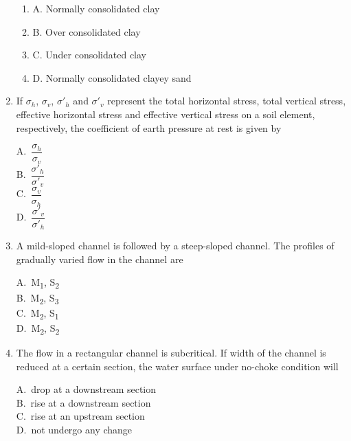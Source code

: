 \documentclass[journal,12pt,onecolumn]{IEEEtran}
\theoremstyle{remark}
\begin{document}
\begin{enumerate}
\begin{enumerate}[label=]
\item A. Normally consolidated clay \\
\item B. Over consolidated clay \\
\item C. Under consolidated clay \\
\item D. Normally consolidated clayey sand
\end{enumerate}

\setlength{\parindent}{0pt}
\setlength{\parskip}{0.5cm}

\raggedright


\noindent\item If $\sigma_h$, $\sigma_v$, $\sigma'_h$ and $\sigma'_v$ represent the total horizontal stress, total vertical stress, effective horizontal stress and effective vertical stress on a soil element, respectively, the coefficient of earth pressure at rest is given by
\hfill{}
\begin{multicols}{4}
A.\ $\dfrac{\sigma_h}{\sigma_v}$ \\
B.\ $\dfrac{\sigma'_h}{\sigma'_v}$ \\
C.\ $\dfrac{\sigma_v}{\sigma_h}$ \\
D.\ $\dfrac{\sigma'_v}{\sigma'_h}$
\end{multicols}

\noindent\item A mild-sloped channel is followed by a steep-sloped channel. The profiles of gradually varied flow in the channel are
\hfill{}
\begin{multicols}{4}
A.\ M\textsubscript{1}, S\textsubscript{2} \\
B.\ M\textsubscript{2}, S\textsubscript{3} \\
C.\ M\textsubscript{2}, S\textsubscript{1} \\
D.\ M\textsubscript{2}, S\textsubscript{2}
\end{multicols}

\noindent\item The flow in a rectangular channel is subcritical. If width of the channel is reduced at a certain section, the water surface under no-choke condition will
\hfill{}
\begin{multicols}{4}
A.\ drop at a downstream section \\
B.\ rise at a downstream section \\
C.\ rise at an upstream section \\
D.\ not undergo any change
\end{multicols}


\end{enumerate}
\end{document}
